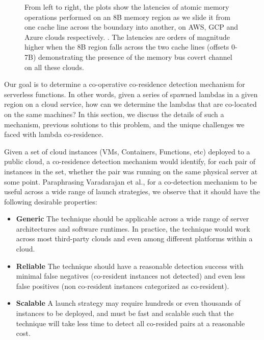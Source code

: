 \begin{figure}[h!]
\begin{subfigure}{.33\textwidth}
\end{subfigure}
\caption{From left to right, the plots show the latencies of atomic 
      memory operations performed on an 8B memory region as we slide it 
      from one cache line across the boundary into another, on AWS, GCP and 
      Azure clouds respectively. . The latencies 
      are orders of magnitude higher when the 8B region falls across the 
      two cache lines (offsets 0-7B) demonstrating the presence of 
      the memory bus covert channel on all these clouds. \label{fig:membus_clouds}}
\label{fig:fig}
\end{figure}


Our goal is to determine a co-operative co-residence detection mechanism for
serverless functions. In other words, given a series of spawned lambdas in a
given region on a cloud service, how can we determine the lambdas that are
co-located on the same machines?  In this section, we discuss the details of
such a mechanism, previous solutions to this problem, and the unique challenges
we faced with lambda co-residence.

Given a set of cloud instances (VMs, Containers, Functions, etc) deployed
to a public cloud, a co-residence detection mechanism would identify, for each 
pair of instances in the set, whether the pair was running on the same physical 
server at some point. Paraphrasing Varadarajan et al.\cite{varadarajan2015}, for 
a co-detection mechanism to be useful across a wide range of 
launch strategies, we observe that it should have the following desirable 
properties:

\begin{itemize}
    \item \textbf{Generic} The technique should be applicable across a wide
    range of server architectures and software runtimes. In practice, the
    technique would work across most third-party clouds and even among different
    platforms within a cloud.
    \item \textbf{Reliable} The technique should have a reasonable detection success
    with minimal false negatives (co-resident instances not detected) and even 
    less false positives (non co-resident instances categorized as co-resident).
    \item \textbf{Scalable} A launch strategy may require hundreds or even thousands 
    of instances to be deployed, and must be fast and scalable such that the 
    technique will take less time to detect all co-resided pairs at a reasonable cost.
\end{itemize}

